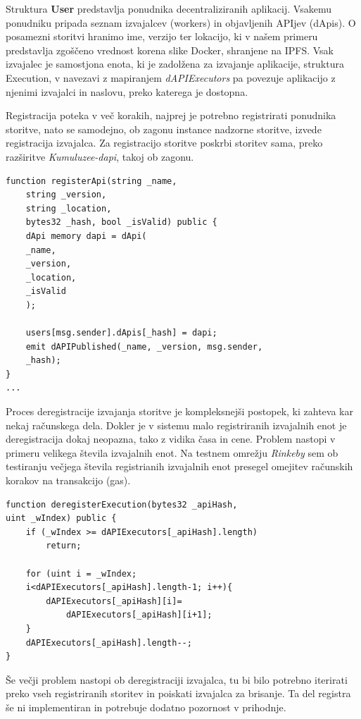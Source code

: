 \documentclass[a4paper, 12pt]{book}
\begin{document}
Struktura \textbf{User} predstavlja ponudnika decentraliziranih aplikacij.
Vsakemu ponudniku pripada seznam izvajalcev (workers) in objavljenih APIjev (dApis).
O posamezni storitvi hranimo ime, verzijo ter lokacijo, ki v našem primeru predstavlja zgoščeno vrednost korena slike Docker, shranjene na IPFS.
Vsak izvajalec je samostjona enota, ki je zadolžena za izvajanje aplikacije, struktura Execution, v navezavi z mapiranjem \textit{dAPIExecutors} pa povezuje aplikacijo z njenimi izvajalci in naslovu, preko katerega je dostopna.

Registracija poteka v več korakih, najprej je potrebno registrirati ponudnika storitve, nato se samodejno, ob zagonu instance nadzorne storitve, izvede registracija izvajalca.
Za registracijo storitve poskrbi storitev sama, preko razširitve \textit{Kumuluzee-dapi}, takoj ob zagonu.

\begin{lstlisting}
function registerApi(string _name,
	string _version,
	string _location,
	bytes32 _hash, bool _isValid) public {
	dApi memory dapi = dApi(
	_name,
	_version,
	_location,
	_isValid
	);
	
	users[msg.sender].dApis[_hash] = dapi;
	emit dAPIPublished(_name, _version, msg.sender,
	_hash);
}
...
\end{lstlisting}

Proces deregistracije izvajanja storitve je kompleksnejši postopek, ki zahteva kar nekaj računskega dela.
Dokler je v sistemu malo registriranih izvajalnih enot je deregistracija dokaj neopazna, tako z vidika časa in cene.
Problem nastopi v primeru velikega števila izvajalnih enot.
Na testnem omrežju \textit{Rinkeby} sem ob testiranju večjega števila registrianih izvajalnih enot presegel omejitev računskih korakov na transakcijo (gas).

\begin{lstlisting}
function deregisterExecution(bytes32 _apiHash, 
uint _wIndex) public {
	if (_wIndex >= dAPIExecutors[_apiHash].length)
		return;
	
	for (uint i = _wIndex;
	i<dAPIExecutors[_apiHash].length-1; i++){
		dAPIExecutors[_apiHash][i]=
			dAPIExecutors[_apiHash][i+1];
	}
	dAPIExecutors[_apiHash].length--;
}
\end{lstlisting}

Še večji problem nastopi ob deregistraciji izvajalca, tu bi bilo potrebno iterirati preko vseh registriranih storitev in poiskati izvajalca za brisanje.
Ta del registra še ni implementiran in potrebuje dodatno pozornost v prihodnje.
\end{document}
